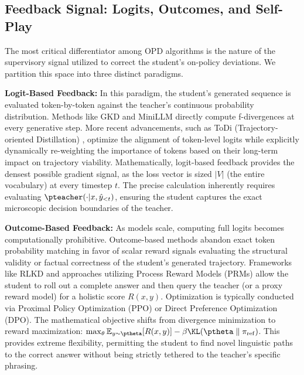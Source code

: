 \subsection{Feedback Signal: Logits, Outcomes, and Self-Play}
\label{subsec:tax_feedback}

The most critical differentiator among OPD algorithms is the nature of the supervisory signal utilized to correct the student's on-policy deviations. We partition this space into three distinct paradigms.

\textbf{Logit-Based Feedback:} In this paradigm, the student's generated sequence is evaluated token-by-token against the teacher's continuous probability distribution. Methods like GKD \citep{2306.13649} and MiniLLM \citep{2306.08543} directly compute f-divergences at every generative step. More recent advancements, such as ToDi (Trajectory-oriented Distillation) \citep{2505.16297}, optimize the alignment of token-level logits while explicitly dynamically re-weighting the importance of tokens based on their long-term impact on trajectory viability. Mathematically, logit-based feedback provides the densest possible gradient signal, as the loss vector is sized $|V|$ (the entire vocabulary) at every timestep $t$. The precise calculation inherently requires evaluating $\pteacher(\cdot|x, \hat{y}_{<t})$, ensuring the student captures the exact microscopic decision boundaries of the teacher.

\textbf{Outcome-Based Feedback:} As models scale, computing full logits becomes computationally prohibitive. Outcome-based methods abandon exact token probability matching in favor of scalar reward signals evaluating the structural validity or factual correctness of the student's generated trajectory. Frameworks like RLKD \citep{2505.16142} and approaches utilizing Process Reward Models (PRMs) \citep{2305.20050} allow the student to roll out a complete answer and then query the teacher (or a proxy reward model) for a holistic score $R(x, y)$. Optimization is typically conducted via Proximal Policy Optimization (PPO) or Direct Preference Optimization (DPO). The mathematical objective shifts from divergence minimization to reward maximization: $\max_\theta \mathbb{E}_{y \sim \ptheta} [R(x, y)] - \beta \KL(\ptheta \parallel \pi_{\mathrm{ref}})$. This provides extreme flexibility, permitting the student to find novel linguistic paths to the correct answer without being strictly tethered to the teacher's specific phrasing.

